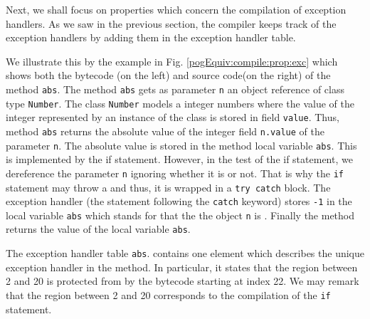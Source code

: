 Next, we shall focus on properties which concern the compilation of exception handlers. 
As we saw in the previous section, the compiler keeps track of the exception 
handlers by adding them in the exception handler table. 

We illustrate this by the example in Fig. \ref{pogEquiv:compile:prop:exc} which shows both the bytecode (on the left) and source code(on the right)
 of the method \lstinline!abs!.
The method \lstinline!abs! gets as parameter \lstinline!n! an object reference of class type  \lstinline!Number!. The class  \lstinline!Number!
models a integer numbers where the value of the integer represented by an instance of the class is stored in field \lstinline!value!. 
 Thus, method  \lstinline!abs! returns  the absolute value of the integer field \lstinline!n.value! of the parameter \lstinline!n!. The absolute value is stored
in the method local variable \lstinline!abs!. This is implemented by the if statement. However, in the test of the if statement, we dereference
 the parameter  \lstinline!n! ignoring whether it is \Mynull{} or not. That is why the \lstinline!if! statement may throw a \NullPointerExc{} and thus,
 it is wrapped in a \lstinline!try catch! block. 
The exception handler (the statement following the \lstinline!catch! keyword)
stores \lstinline!-1! in the local variable \lstinline!abs! which stands for that the 
the object  \lstinline!n! is \Mynull.   
Finally the method returns the value of the local variable \lstinline!abs!.

 The exception handler table  \lstinline!abs!.\ExcHandler{}  contains one element which describes the unique exception handler
in the method. In particular, it states that the region between 2 and 20 is protected from \NullPointerExc{} by the bytecode starting at index 22.
 We may remark that the region between 2 and 20 corresponds to the compilation of the \lstinline!if! statement. 

